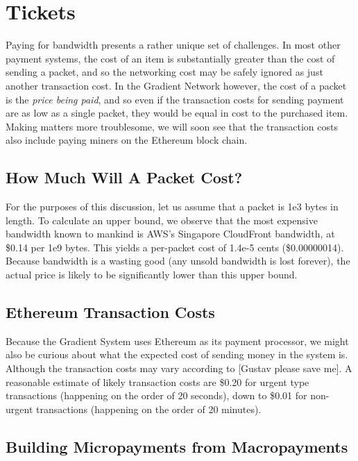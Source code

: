 \documentclass{article}
\begin{document}
\section{Tickets}
\label{sec:tickets}

Paying for bandwidth presents a rather unique set of challenges. In most other payment systems, the cost of an item is substantially greater than the cost of sending a packet, and so the networking cost may be safely ignored as just another transaction cost. In the Gradient Network however, the cost of a packet is the \emph{price being paid}, and so even if the transaction costs for sending payment are as low as a single packet, they would be equal in cost to the purchased item. Making matters more troublesome, we will soon see that the transaction costs also include paying miners on the Ethereum block chain.

\subsection{How Much Will A Packet Cost?}

For the purposes of this discussion, let us assume that a packet is 1e3 bytes in length. To calculate an upper bound, we observe that the most expensive bandwidth known to mankind is AWS's Singapore CloudFront bandwidth, at \$0.14 per 1e9 bytes. This yields a per-packet cost of 1.4e-5 cents (\$0.00000014). Because bandwidth is a wasting good (any unsold bandwidth is lost forever), the actual price is likely to be significantly lower than this upper bound.

\subsection{Ethereum Transaction Costs}

Because the Gradient System uses Ethereum as its payment processor, we might also be curious about what the expected cost of sending money in the system is. Although the transaction costs may vary according to [Gustav please save me]. A reasonable estimate of likely transaction costs are \$0.20 for urgent type transactions (happening on the order of 20 seconds), down to \$0.01 for non-urgent transactions (happening on the order of 20 minutes).

\subsection{Building Micropayments from Macropayments}
\end{document}
